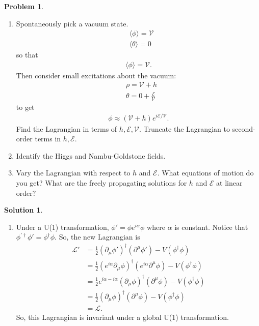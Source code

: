 \documentclass[a4paper,11pt]{article}
\numberwithin{equation}{section}
\theoremstyle{definition}
\newtheorem{prob}{Problem}[section]
\newtheorem{sln}{Solution}[section]
\newcommand{\p}{\partial}
\newcommand{\lag}{\mathcal{L}}
\begin{document}
\begin{prob}
\begin{enumerate}
	\item Spontaneously pick a vacuum state. 
		\begin{align}
		&\langle \phi \rangle = \mathcal{V}\\
		&\langle \theta \rangle = 0
		\end{align}
		so that 
		\begin{align}
		\langle \phi \rangle = \mathcal{V}.
		\end{align}
		Then consider small excitations about the vacuum:
		\begin{align}
		&\rho= \mathcal{V} + h\\
		&\theta = 0 + \frac{\mathcal{E}}{\mathcal{V}}
		\end{align}
		to get
		\begin{align}
		\phi \approx (\mathcal{V} + h)e^{i\mathcal{E}/\mathcal{V}}.
		\end{align}
		Find the Lagrangian in terms of $h, \mathcal{E}, \mathcal{V}$. Truncate the Lagrangian to second-order terms in $h, \mathcal{E}$.\\
		
		
		
		\item Identify the Higgs and Nambu-Goldstone fields. \\
		
		
		\item Vary the Lagrangian with respect to $h$ and $\mathcal{E}$. What equations of motion do you get? What are the freely propagating solutions for $h$ and $\mathcal{E}$ at linear order?\\
		
	\end{enumerate}

	\begin{sln}
		$\,$
		\begin{enumerate}
			\item Under a U(1) transformation, $\phi' = \phi e^{i\alpha}\phi$ where $\alpha$ is constant. Notice that $\phi^{'\dagger}\phi' = \phi^\dagger\phi$. So, the new Lagrangian is
			\begin{align}
			\lag' &= \frac{1}{2}(\p_\mu\phi')^\dagger(\p^\mu\phi') - V(\phi^\dagger\phi)\\
			&= \frac{1}{2}\left(e^{i\alpha}\p_\mu\phi\right)^\dagger(e^{i\alpha}\p^\mu\phi) - V(\phi^\dagger\phi)\\
			&= \frac{1}{2}e^{i\alpha - i\alpha}(\p_\mu\phi)^\dagger(\p^\mu\phi) - V(\phi^\dagger\phi)\\
			&= \frac{1}{2}(\p_\mu\phi)^\dagger(\p^\mu\phi) - V(\phi^\dagger\phi)\\
			&= \lag.
			\end{align}
			So, this Lagrangian is invariant under a global U(1) transformation.\\
			

\end{enumerate}
\end{sln}
\end{prob}
\end{document}
